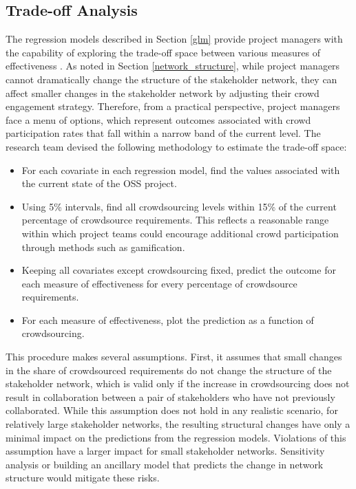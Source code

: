 \subsection{Trade-off Analysis}
\label{trade-off}

The regression models described in Section \ref{glm} provide project managers with the capability of exploring the trade-off space between various measures of effectiveness \cite{parnell}. As noted in Section \ref{network_structure}, while project managers cannot dramatically change the structure of the stakeholder network, they can affect smaller changes in the stakeholder network by adjusting their crowd engagement strategy. Therefore, from a practical perspective, project managers face a menu of options, which represent outcomes associated with crowd participation rates that fall within a narrow band of the current level. The research team devised the following methodology to estimate the trade-off space:

\begin{itemize}
    \item For each covariate in each regression model, find the values associated with the current state of the OSS project.
    \item Using 5\% intervals, find all crowdsourcing levels within 15\% of the current percentage of crowdsource requirements. This reflects a reasonable range within which project teams could encourage additional crowd participation through methods such as gamification. 
    \item Keeping all covariates except crowdsourcing fixed, predict the outcome for each measure of effectiveness for every percentage of crowdsource requirements.
    \item For each measure of effectiveness, plot the prediction as a function of crowdsourcing.
\end{itemize}

This procedure makes several assumptions. First, it assumes that small changes in the share of crowdsourced requirements do not change the structure of the stakeholder network, which is valid only if the increase in crowdsourcing does not result in collaboration between a pair of stakeholders who have not previously collaborated. While this assumption does not hold in any realistic scenario, for relatively large stakeholder networks, the resulting structural changes have only a minimal impact on the predictions from the regression models. Violations of this assumption have a larger impact for small stakeholder networks. Sensitivity analysis or building an ancillary model that predicts the change in network structure would mitigate these risks. 

